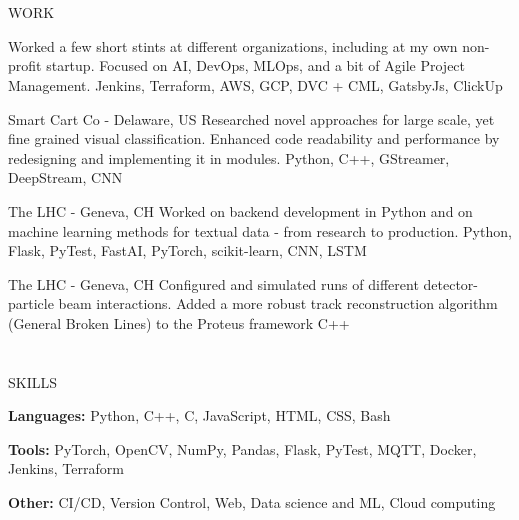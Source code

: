 \documentclass{my_cv}
\begin{document}
\begin{multicols}{2}
\section{\faPencil}{WORK}
    
%
    {}%
    {Worked a few short stints at different organizations, including at my own non-profit startup. Focused on AI, DevOps, MLOps, and a bit of Agile Project Management.}
    {Jenkins, Terraform, AWS, GCP, DVC + CML, GatsbyJs, ClickUp}

%
    {Smart Cart Co - Delaware, US}%
    {Researched novel approaches for large scale, yet fine grained visual classification. Enhanced code readability and performance by redesigning and implementing it in modules.}%
    {Python, C++, GStreamer, DeepStream, CNN}
     
%
    {The LHC - Geneva, CH}%
    {Worked on backend development in Python and on machine learning methods for textual data - from research to production.}%
    {Python, Flask, PyTest, FastAI, PyTorch, scikit-learn, CNN, LSTM}
    
%
    {The LHC - Geneva, CH}%
    {Configured and simulated runs of different detector-particle beam interactions. Added a more robust track reconstruction algorithm (General Broken Lines) to the Proteus framework}%
    {C++}
    
\section{\faList}{SKILLS}

\textbf{Languages:} Python, C++, C, JavaScript, HTML, CSS, Bash

\noindent\textbf{Tools:} PyTorch, OpenCV, NumPy, Pandas, Flask, PyTest, MQTT, Docker, Jenkins, Terraform

\noindent\textbf{Other:} CI/CD, Version Control, Web, Data science and ML, Cloud computing

\columnbreak


\end{multicols}
\end{document}
